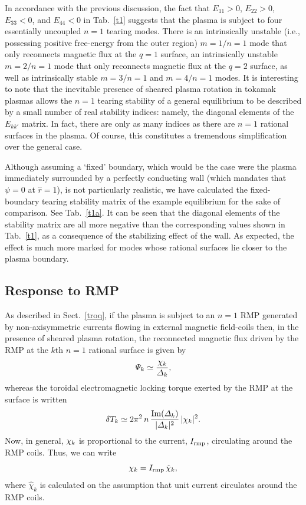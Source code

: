 \documentclass[12pt,prb,aps]{revtex4-1}
\begin{document}
In accordance with the previous discussion, the fact that $E_{11}>0$, $E_{22}>0$, $E_{33}<0$, and $E_{44}<0$ in Tab.~\ref{t1}
suggests that the plasma is subject to four essentially uncoupled $n=1$ tearing modes. There is an
intrinsically unstable (i.e., possessing positive free-energy from the outer region) $m=1/n=1$ mode that only reconnects magnetic flux at the $q=1$ surface,\cite{fkr} an
intrinsically unstable $m=2/n=1$ mode that only reconnects magnetic flux at the $q=2$ surface, as well as 
intrinsically stable $m=3/n=1$ and $m=4/n=1$ modes. It is interesting to note that the inevitable presence of sheared
plasma rotation in tokamak plasmas allows the $n=1$ tearing stability of a general equilibrium to be described by a small number
of real stability indices: namely, the diagonal elements of the $E_{kk'}$ matrix.\cite{am1} In fact, there are only as many indices as there are
$n=1$ rational surfaces in the plasma. Of course, this constitutes a tremendous simplification over the general case. 

Although assuming a `fixed' boundary, which would be the case were the plasma  immediately surrounded by a perfectly conducting wall
(which mandates that $\psi=0$ at $\hat{r}=1$), is not particularly realistic, we have calculated the fixed-boundary tearing stability matrix of the
example equilibrium for the sake of comparison. See Tab.~\ref{t1a}. It can be seen that the diagonal elements of the stability matrix
are all more negative than the corresponding values shown in Tab.~\ref{t1}, as a consequence of the stabilizing effect of the wall. As expected, the effect is much
more marked for modes whose rational surfaces lie closer to the plasma boundary. 

\subsection{Response to RMP}
As described in Sect.~\ref{troq}, if the plasma is subject to an $n=1$ RMP generated by non-axisymmetric currents
flowing in external magnetic field-coils then, in the presence of sheared plasma rotation, 
the reconnected magnetic flux driven by the RMP at the $k$th  $n=1$ rational surface is given by
\begin{equation}
{\mit\Psi}_k\simeq 
\frac{\chi_k}{{\mit\Delta}_k},
\end{equation}
whereas 
the toroidal electromagnetic
locking torque exerted by the RMP at the surface is written
\begin{equation}
\delta T_k\simeq 2\pi^2\,n\,\frac{{\rm Im}({\mit\Delta}_k)}{|{\mit\Delta}_k|^2}\,|{\mit\chi}_k|^2.
\end{equation}
Now, in general, ${\mit\chi}_k$ is proportional to the current, $I_{\rm rmp}$, circulating around the RMP coils. Thus, we
can write 
\begin{equation}
{\mit\chi}_k = I_{\rm rmp}\,\hat{\chi}_k,
\end{equation}
where $\hat{\chi}_k$ is calculated on the assumption that  unit current circulates around the RMP coils. 
\end{document}
